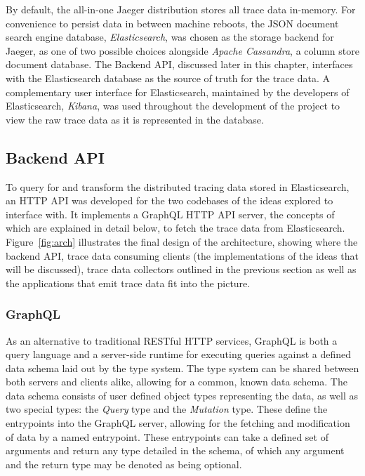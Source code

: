 \documentclass[12pt,pdftex,titlepage]{report}
\begin{document}
                By default, the all-in-one Jaeger distribution stores all trace data in-memory. For convenience to persist data in between machine reboots, the JSON document search engine
                database, \textit{Elasticsearch}, was chosen as the storage backend for Jaeger, as one of two possible choices alongside \textit{Apache Cassandra}, a column store document
                database. The Backend API, discussed later in this chapter, interfaces with the Elasticsearch database as the source of truth for the trace data. A complementary user interface
                for Elasticsearch, maintained by the developers of Elasticsearch, \textit{Kibana}, was used throughout the development of the project to view the raw trace data as it is 
                represented in the database.

            \subsection{Backend API}
                To query for and transform the distributed tracing data stored in Elasticsearch, an HTTP API was developed for the two codebases of the ideas explored to interface with.
                It implements a GraphQL HTTP API server, the concepts of which are explained in detail below, to fetch the trace data from Elasticsearch. Figure~\ref{fig:arch} illustrates
                the final design of the architecture, showing where the backend API, trace data consuming clients (the implementations of the ideas that will be discussed), trace data collectors
                outlined in the previous section as well as the applications that emit trace data fit into the picture.

                \subsubsection{GraphQL}
                    As an alternative to traditional RESTful HTTP services, GraphQL is both a query language and a server-side runtime for executing queries against a defined data schema
                    laid out by the type system. The type system can be shared between both servers and clients alike, allowing for a common, known data schema. The data schema consists of 
                    user defined object types representing the data, as well as two special types: the \textit{Query} type and the \textit{Mutation} type. These define the entrypoints into
                    the GraphQL server, allowing for the fetching and modification of data by a named entrypoint. These entrypoints can take a defined set of arguments and return any type
                    detailed in the schema, of which any argument and the return type may be denoted as being optional.
\end{document}
